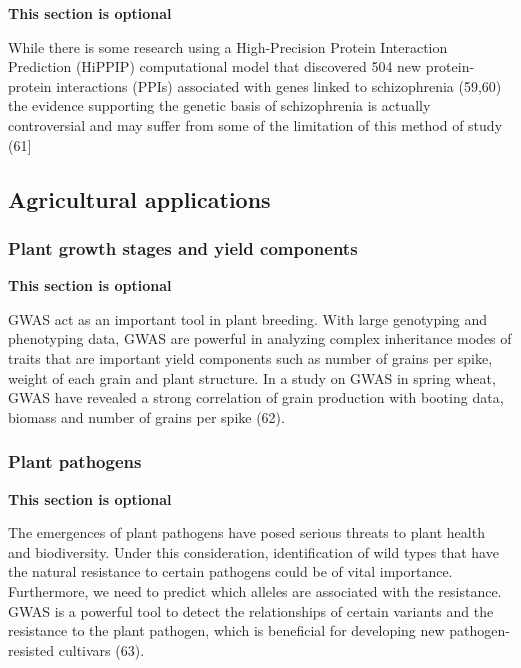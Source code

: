 \documentclass[
]{book}
\begin{document}
\textbf{This section is optional}

While there is some research using a High-Precision Protein Interaction Prediction (HiPPIP) computational model that discovered 504 new protein-protein interactions (PPIs) associated with genes linked to schizophrenia (59,60) the evidence supporting the genetic basis of schizophrenia is actually controversial and may suffer from some of the limitation of this method of study (61{]}

\hypertarget{agricultural-applications}{%
\subsection{Agricultural applications}\label{agricultural-applications}}

\hypertarget{plant-growth-stages-and-yield-components}{%
\subsubsection{Plant growth stages and yield components}\label{plant-growth-stages-and-yield-components}}

\textbf{This section is optional}

GWAS act as an important tool in plant breeding. With large genotyping and phenotyping data, GWAS are powerful in analyzing complex inheritance modes of traits that are important yield components such as number of grains per spike, weight of each grain and plant structure. In a study on GWAS in spring wheat, GWAS have revealed a strong correlation of grain production with booting data, biomass and number of grains per spike (62).

\hypertarget{plant-pathogens}{%
\subsubsection{Plant pathogens}\label{plant-pathogens}}

\textbf{This section is optional}

The emergences of plant pathogens have posed serious threats to plant health and biodiversity. Under this consideration, identification of wild types that have the natural resistance to certain pathogens could be of vital importance. Furthermore, we need to predict which alleles are associated with the resistance. GWAS is a powerful tool to detect the relationships of certain variants and the resistance to the plant pathogen, which is beneficial for developing new pathogen-resisted cultivars (63).
\end{document}
